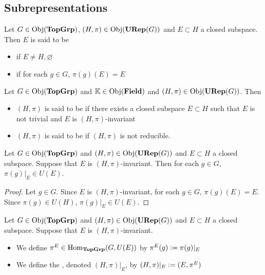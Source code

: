 \documentclass{book}
\begin{document}
	
	
	
	
	
	
	\subsection{Subrepresentations}
	
	\begin{defn}
		Let $G \in \operatorname{Obj}(\operatorname*{\text{\textbf{TopGrp}}})$, $(H, \pi) \in \operatorname{Obj}(\operatorname*{\text{\textbf{URep}}}(G))$ and $E \subset H$ a closed subspace. Then $E$ is said to be 
		\begin{itemize}
			\item {} if $E \neq H, \varnothing$
			\item {} if for each $g \in G$, $\pi(g)(E) = E$
		\end{itemize} 
	\end{defn}

	\begin{defn}
		Let $G \in \operatorname{Obj}(\operatorname*{\text{\textbf{TopGrp}}})$ and $\mathbb{K} \in \operatorname{Obj}(\operatorname*{\text{\textbf{Field}}})$ and $(H, \pi) \in \operatorname{Obj}(\operatorname*{\text{\textbf{URep}}}(G))$. Then 
		\begin{itemize}
			\item $(H, \pi)$ is said to be  if there exists a closed subspace $E \subset H$ such that $E$ is not trivial and $E$ is $(H, \pi)$-invariant 
			\item $(H, \pi)$ is said to be  if $(H, \pi)$ is not reducible.
		\end{itemize}
	\end{defn}

	\begin{ex}
		Let $G \in \operatorname{Obj}(\operatorname*{\text{\textbf{TopGrp}}})$ and $(H, \pi) \in \operatorname{Obj}(\operatorname*{\text{\textbf{URep}}}(G))$ and $E \subset H$ a closed subspace. Suppose that $E$ is $(H, \pi)$-invariant. Then for each $g \in G$, $\pi(g)|_E \in U(E)$. 
	\end{ex}

	\begin{proof}
		Let $g \in G$. Since $E$ is $(H, \pi)$-invariant, for each $g \in G$, $\pi(g)(E) = E$. Since $\pi(g) \in U(H)$, $\pi(g)|_E \in U(E)$.
	\end{proof}

	\begin{defn}
		Let $G \in \operatorname{Obj}(\operatorname*{\text{\textbf{TopGrp}}})$ and $(H, \pi) \in \operatorname{Obj}(\operatorname*{\text{\textbf{URep}}}(G))$ and $E \subset H$ a closed subspace. Suppose that $E$ is $(H, \pi)$-invariant. 
		\begin{itemize}
			\item We define $\pi^E \in \operatorname{Hom}_{\operatorname*{\text{\textbf{TopGrp}}}}(G, U(E))$ by $\pi^E(g) \vcentcolon= \pi(g)|_E$
			\item We define the , denoted $(H, \pi)|_E$, by $(H, \pi)|_E \vcentcolon= (E, \pi^E)$
		\end{itemize}
	\end{defn}
\end{document}
